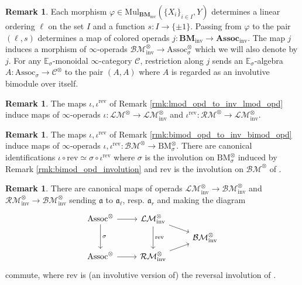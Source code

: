 \documentclass{article}
\renewcommand{\phi}{\varphi}
\newcommand{\EE}{\mathbb{E}}
\newcommand{\Associnv}{\mathrm{Assoc}_\sigma}
\newcommand{\BMinv}{\mathrm{BM}_\sigma} %
\theoremstyle{definition}
\newtheorem{remark}[theorem]{Remark}
\newcommand{\Lucy}[1]{\todo[color=cyan!30]{\footnotesize L: #1}}
\begin{document}
\begin{remark}\label{rmk:inv_bimod_opd_to_inv_alg_opd} %
    Each morphism $ \phi \in \mathrm{Mul}_{\mathbf{BM}_\mathrm{inv}} \left(\{X_i\}_{i \in I}, Y\right) $ determines a linear ordering $\ell $ on the set $ I $ and a function $ s \colon I \to \{\pm 1\} $. 
    Passing from $ \phi $ to the pair $ (\ell, s) $ determines a map of colored operads $ j \colon \mathbf{BM}_\mathrm{inv} \to \mathbf{Assoc}_\mathrm{inv} $. 
    The map $ j $ induces a morphism of $ \infty $-operads $  \mathcal{BM}_{\mathrm{inv}}^\otimes \to \Associnv^\otimes $ which we will also denote by $ j $. 
    For any $ \EE_\sigma $-monoidal $ \infty $-category $ \mathcal{C} $, restriction along $ j $ sends an $ \EE_\sigma $-algebra $ A \colon \Associnv \to \mathcal{C}^{\otimes} $ to the pair $ (A, A) $ where $ A $ is regarded as an involutive\Lucy{hermitian} bimodule over itself. 
\end{remark} 
\begin{remark}\label{rmk:lmod_infty_opd_to_inv_lmod_infty_opd}
    The maps $ \iota, \iota^{\mathrm{rev}} $ of Remark \ref{rmk:lmod_opd_to_inv_lmod_opd} induce maps of $ \infty $-operads $ \iota \colon \mathcal{LM}^\otimes \to \mathcal{LM}^\otimes_{\mathrm{inv}} $ and $ \iota^{\mathrm{rev}} \colon \mathcal{RM}^\otimes \to \mathcal{LM}^\otimes_{\mathrm{inv}} $. 
\end{remark}
\begin{remark}\label{rmk:bimod_infty_opd_to_inv_bimod_infty_opd}
    The maps $ \iota, \iota^{\mathrm{rev}} $ of Remark \ref{rmk:bimod_opd_to_inv_bimod_opd} induce maps of $ \infty $-operads $ \iota, \iota^{\mathrm{rev}} \colon \mathcal{BM}^\otimes \to \BMinv^\otimes $. 
    There are canonical identifications $ \iota \circ \mathrm{rev} \simeq \sigma \circ \iota^{\mathrm{rev}} $ where $ \sigma $ is the involution on $ \BMinv^\otimes $ induced by Remark \ref{rmk:bimod_opd_involution} and $ \mathrm{rev} $ is the involution on $ \mathcal{BM}^\otimes $ of \cite[Construction 4.6.3.1]{LurHA}. 
\end{remark}
\begin{remark}\label{rmk:rmod_lmod_opd_to_inv_bimod_opd}
    There are canonical maps of operads $ \mathcal{LM}^\otimes_{\mathrm{inv}} \to \mathcal{BM}^\otimes_{\mathrm{inv}} $ and $ \mathcal{RM}^\otimes_{\mathrm{inv}} \to \mathcal{BM}^\otimes_{\mathrm{inv}} $ sending $ \mathfrak{a} $ to $ \mathfrak{a}_\ell $, resp. $ \mathfrak{a}_r $ and making the diagram 
    \begin{equation*}
    \begin{tikzcd}[row sep=tiny]
        \mathrm{Assoc}^\otimes \ar[dd,"\sigma"] \ar[r] & \mathcal{LM}^\otimes_{\mathrm{inv}} \ar[dd,"{\mathrm{rev}}"] \ar[rd] & \\
        & & \mathcal{BM}^\otimes_{\mathrm{inv}}  \\ 
        \mathrm{Assoc}^\otimes  \ar[r] & \mathcal{RM}^\otimes_{\mathrm{inv}} \ar[ru] & 
    \end{tikzcd}   
    \end{equation*}
    commute, where $ \mathrm{rev} $ is (an involutive version of) the reversal involution of \cite[Remark 4.6.3.2]{LurHA}. 
\end{remark}
\end{document}
